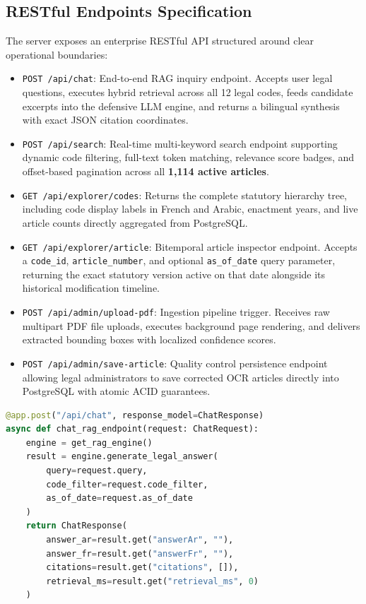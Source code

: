 \documentclass[12pt,a4paper]{report}
\begin{document}
\subsection{RESTful Endpoints Specification}
The server exposes an enterprise RESTful API structured around clear operational boundaries:
\begin{itemize}[leftmargin=20pt, itemsep=3pt]
    \item \texttt{POST /api/chat}: End-to-end RAG inquiry endpoint. Accepts user legal questions, executes hybrid retrieval across all 12 legal codes, feeds candidate excerpts into the defensive LLM engine, and returns a bilingual synthesis with exact JSON citation coordinates.
    \item \texttt{POST /api/search}: Real-time multi-keyword search endpoint supporting dynamic code filtering, full-text token matching, relevance score badges, and offset-based pagination across all \textbf{1,114 active articles}.
    \item \texttt{GET /api/explorer/codes}: Returns the complete statutory hierarchy tree, including code display labels in French and Arabic, enactment years, and live article counts directly aggregated from PostgreSQL.
    \item \texttt{GET /api/explorer/article}: Bitemporal article inspector endpoint. Accepts a \texttt{code\_id}, \texttt{article\_number}, and optional \texttt{as\_of\_date} query parameter, returning the exact statutory version active on that date alongside its historical modification timeline.
    \item \texttt{POST /api/admin/upload-pdf}: Ingestion pipeline trigger. Receives raw multipart PDF file uploads, executes background page rendering, and delivers extracted bounding boxes with localized confidence scores.
    \item \texttt{POST /api/admin/save-article}: Quality control persistence endpoint allowing legal administrators to save corrected OCR articles directly into PostgreSQL with atomic ACID guarantees.
\end{itemize}

\begin{lstlisting}[language=Python, caption={FastAPI Endpoint Definition for End-to-End Grounded RAG}]
@app.post("/api/chat", response_model=ChatResponse)
async def chat_rag_endpoint(request: ChatRequest):
    engine = get_rag_engine()
    result = engine.generate_legal_answer(
        query=request.query,
        code_filter=request.code_filter,
        as_of_date=request.as_of_date
    )
    return ChatResponse(
        answer_ar=result.get("answerAr", ""),
        answer_fr=result.get("answerFr", ""),
        citations=result.get("citations", []),
        retrieval_ms=result.get("retrieval_ms", 0)
    )
\end{lstlisting}
\end{document}
